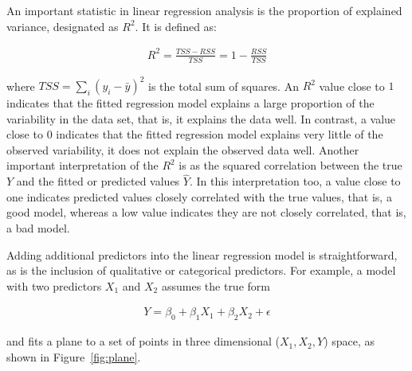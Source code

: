 
An important statistic in linear regression analysis is the proportion of explained variance, designated as $R^2$. It is defined as:

\begin{align*}
R^2 = \frac{TSS - RSS}{TSS} = 1 - \frac{RSS}{TSS}
\end{align*}

\noindent where $TSS = \sum_i(y_i - \bar{y})^2$ is the total sum of squares. An $R^2$ value close to $1$ indicates that the fitted regression model explains a large proportion of the variability in the data set, that is, it explains the data well. In contrast, a value close to $0$ indicates that the fitted regression model explains very little of the observed variability, it does not explain the observed data well. Another important interpretation of the $R^2$ is as the squared correlation between the true $Y$ and the fitted or predicted values $\hat{Y}$. In this interpretation too, a value close to one indicates predicted values closely correlated with the true values, that is, a good model, whereas a low value indicates they are not closely correlated, that is, a bad model.

Adding additional predictors into the linear regression model is straightforward, as is the inclusion of qualitative or categorical predictors. For example, a model with two predictors $X_1$ and $X_2$ assumes the true form

\begin{align*}
Y = \beta_0 + \beta_1 X_1 + \beta_2 X_2 + \epsilon
\end{align*}

\noindent and fits a plane to a set of points in three dimensional ($X_1, X_2, Y$) space, as shown in Figure~\ref{fig:plane}. 

